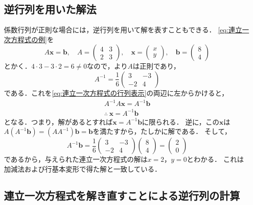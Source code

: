 \subsection{逆行列を用いた解法}

係数行列が正則な場合には，逆行列を用いて解を表すこともできる．
\eqref{eq:連立一次方程式の例}を
\begin{equation}
  A\bm{x} = \bm{b}, \quad
  A = \begin{pmatrix} 4 & 3 \\ 2 & 3 \end{pmatrix}, \quad
  \bm{x} = \begin{pmatrix} x \\ y \end{pmatrix}, \quad
  \bm{b} = \begin{pmatrix} 8 \\ 4 \end{pmatrix} \label{eq:連立一次方程式の行列表示}
\end{equation}
とかく．$4 \cdot 3 - 3 \cdot 2 = 6 \ne 0$なので，より$A$は正則であり，
\[
  A^{-1} = \frac{1}{6} \begin{pmatrix} 3 & -3 \\ -2 & 4 \end{pmatrix}
\]
である．これを\eqref{eq:連立一次方程式の行列表示}の両辺に左からかけると，
\begin{gather*}
  A^{-1}A\bm{x} = A^{-1}\bm{b} \\
  \therefore~ \bm{x} = A^{-1}\bm{b}
  \end{gather*}
となる．つまり，解があるとすれば$\bm{x} = A^{-1}\bm{b}$に限られる．
逆に，この$\bm{x}$は$A(A^{-1}\bm{b}) = (AA^{-1})\bm{b} = \bm{b}$を満たすから，たしかに解である．
そして，
\[
  A^{-1}\bm{b} = \frac{1}{6}
  \begin{pmatrix} 3 & -3 \\ -2 & 4 \end{pmatrix}
  \begin{pmatrix} 8 \\ 4 \end{pmatrix}
  =
  \begin{pmatrix} 2 \\ 0 \end{pmatrix}
\]
であるから，与えられた連立一次方程式の解は$x = 2$，$y = 0$とわかる．
これは加減法および行基本変形で得た解と一致している．

\subsection{連立一次方程式を解き直すことによる逆行列の計算}

